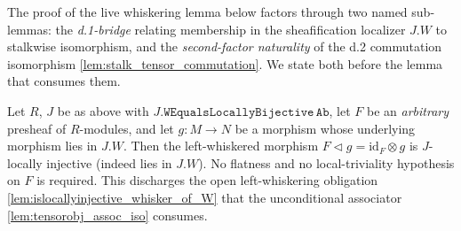 The proof of the live whiskering lemma below factors through two named
sub-lemmas: the \emph{d.1-bridge} relating membership in the sheafification
localizer \(J.W\) to stalkwise isomorphism, and the \emph{second-factor
naturality} of the d.2 commutation isomorphism \cref{lem:stalk_tensor_commutation}.
We state both before the lemma that consumes them.

\begin{lemma}\leanok
  \label{lem:islocallyinjective_whiskerleft_via_stalk}
  Let \(R\), \(J\) be as above with \(J.\mathtt{WEqualsLocallyBijective}\,\mathtt{Ab}\),
  let \(F\) be an \emph{arbitrary} presheaf of \(R\)-modules, and let \(g : M \to N\)
  be a morphism whose underlying morphism lies in \(J.W\). Then the left-whiskered
  morphism \(F \triangleleft g = \mathrm{id}_F \otimes g\) is \(J\)-locally injective
  (indeed lies in \(J.W\)). No flatness and no local-triviality hypothesis on \(F\) is
  required. This discharges the open left-whiskering obligation
  \cref{lem:islocallyinjective_whisker_of_W} that the unconditional associator
  \cref{lem:tensorobj_assoc_iso} consumes.
\end{lemma}


